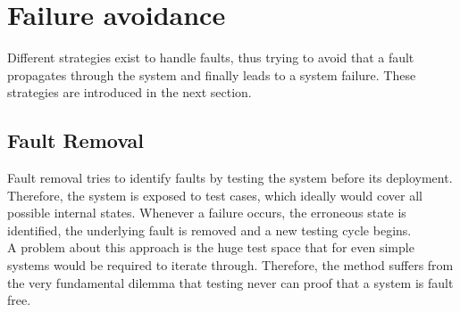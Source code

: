 \section{Failure avoidance}

Different strategies exist to handle faults, thus trying to avoid that a fault propagates through the system and finally leads to a system failure.
These strategies are introduced in the next section.

\subsection{Fault Removal}
Fault removal tries to identify faults by testing the system before its deployment. 
\\
Therefore, the system is exposed to test cases, which ideally would cover all possible internal states. Whenever a failure occurs, the erroneous state is identified, the
underlying fault is removed and a new testing cycle begins.
\\
A problem about this approach is the huge test space that for even simple systems would be required to iterate through. Therefore, the method suffers from the very
fundamental dilemma that testing never can proof that a system is fault free.
